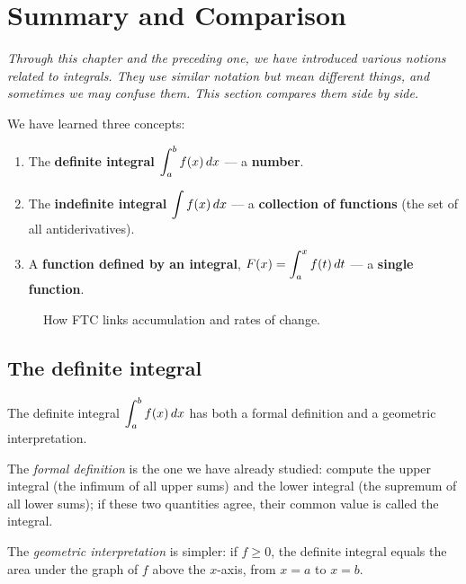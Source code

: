 \section{Summary and Comparison}
\label{sec:8.7}

\textit{Through this chapter and the preceding one, we have introduced various notions related to integrals.  They use similar notation but mean different things, and sometimes we may confuse them.  This section compares them side by side.}

We have learned three concepts:

\begin{enumerate}
  \item The \textbf{definite integral} $\displaystyle\int_{a}^{b} f(x)\,dx$ --- a \textbf{number}.
  \item The \textbf{indefinite integral} $\displaystyle\int f(x)\,dx$ --- a \textbf{collection of functions} (the set of all antiderivatives).
  \item A \textbf{function defined by an integral}, $F(x) = \displaystyle\int_{a}^{x} f(t)\,dt$ --- a \textbf{single function}.
\end{enumerate}

\begin{figure}[ht]
  \centering
  
  \caption{How FTC links accumulation and rates of change.}
  \label{fig:ftc-commutative-diagram}
\end{figure}

\subsection*{The definite integral}

The definite integral $\displaystyle\int_{a}^{b} f(x)\,dx$ has both a formal definition and a geometric interpretation.

The \textit{formal definition} is the one we have already studied: compute the upper integral (the infimum of all upper sums) and the lower integral (the supremum of all lower sums); if these two quantities agree, their common value is called the integral.

The \textit{geometric interpretation} is simpler: if $f \ge 0$, the definite integral equals the area under the graph of $f$ above the $x$-axis, from $x = a$ to $x = b$.

